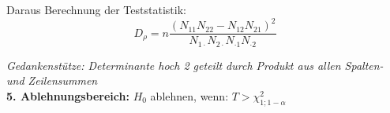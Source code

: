 Daraus Berechnung der Teststatistik:
\begin{equation*}
    D_{\rho} = n \frac{(N_{11}N_{22}-N_{12}N_{21})^2}{N_{1\cdot}N_{2\cdot}N_{\cdot1}N_{\cdot2}}
\end{equation*}

\emph{Gedankenstütze: Determinante hoch 2 geteilt durch Produkt aus allen Spalten- und Zeilensummen}\\

\textbf{5. Ablehnungsbereich:} \(H_0\) ablehnen, wenn:  \(T > \chi^2_{1;1-\alpha}\)\\